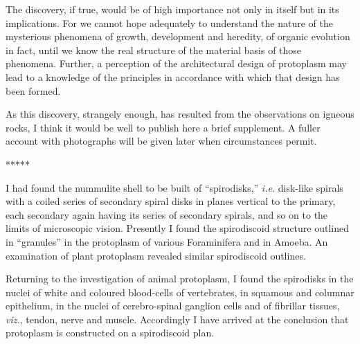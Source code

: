 \documentclass[a4paper, 12pt, oneside, landscape]{article}
\begin{document}
The discovery, if true, would be of high importance not only in itself but in its implications. For we cannot hope adequately to understand the nature of the mysterious phenomena of growth, development and heredity, of organic evolution in fact, until we know the real structure of the material basis of those phenomena. Further, a perception of the architectural design of protoplasm may lead to a knowledge of the principles in accordance with which that design has been formed.

As this discovery, strangely enough, has resulted from the observations on igneous rocks, I think it would be well to publish here a brief supplement. A fuller account with photographs will be given later when circumstances permit.

\centerline{*\hspace{15mm}*\hspace{15mm}*\hspace{15mm}*\hspace{15mm}*}
\bigskip

I had found the nummulite shell to be built of ``spirodisks,'' \emph{i.e.} disk-like spirals with a coiled series of secondary spiral disks in planes vertical to the primary, each secondary again having its series of secondary spirals, and so on to the limits of microscopic vision. Presently I found the spirodiscoid structure outlined in ``granules'' in the protoplasm of various Foraminifera and in Amoeba. An examination of plant protoplasm revealed similar spirodiscoid outlines.

Returning to the investigation of animal protoplasm, I found the spirodisks in the nuclei of white and coloured blood-cells of vertebrates, in squamous and columnar epithelium, in the nuclei of cerebro-spinal ganglion cells and of fibrillar tissues, \emph{viz.}, tendon, nerve and muscle. Accordingly I have arrived at the conclusion that protoplasm is constructed on a spirodiscoid plan.
\end{document}
